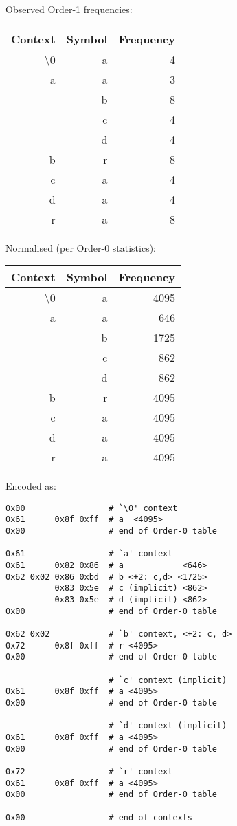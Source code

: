 \documentclass[a4paper]{article}
\begin{document}
\begin{minipage}[t]{0.5\textwidth}
Observed Order-1 frequencies:
\\[8pt]
\begin{tabular}{ |r|r|r| }
\hline
Context & Symbol & Frequency\\
\hline
\textbackslash0 & a & 4 \\
\hline
a & a & 3 \\
  & b & 8 \\
  & c & 4 \\
  & d & 4 \\
\hline
b & r & 8 \\
\hline
c & a & 4 \\
\hline
d & a & 4 \\
\hline
r & a & 8 \\
\hline
\end{tabular}
\end{minipage}
\begin{minipage}[t]{0.5\textwidth}
Normalised (per Order-0 statistics):
\\[8pt]
\begin{tabular}{ |r|r|r|}
\hline
Context & Symbol & Frequency\\
\hline
\textbackslash0 & a & 4095 \\
\hline
a & a &  646 \\
  & b & 1725 \\
  & c &  862 \\
  & d &  862 \\
\hline
b & r & 4095 \\
\hline
c & a & 4095 \\
\hline
d & a & 4095 \\
\hline
r & a & 4095 \\
\hline
\end{tabular}
\end{minipage}


Encoded as:
\begin{verbatim}
0x00                 # `\0' context
0x61      0x8f 0xff  # a  <4095>
0x00                 # end of Order-0 table

0x61                 # `a' context
0x61      0x82 0x86  # a            <646>
0x62 0x02 0x86 0xbd  # b <+2: c,d> <1725>
          0x83 0x5e  # c (implicit) <862>
          0x83 0x5e  # d (implicit) <862>
0x00                 # end of Order-0 table

0x62 0x02            # `b' context, <+2: c, d>
0x72      0x8f 0xff  # r <4095>
0x00                 # end of Order-0 table

                     # `c' context (implicit)
0x61      0x8f 0xff  # a <4095>
0x00                 # end of Order-0 table

                     # `d' context (implicit)
0x61      0x8f 0xff  # a <4095>
0x00                 # end of Order-0 table

0x72                 # `r' context
0x61      0x8f 0xff  # a <4095>
0x00                 # end of Order-0 table

0x00                 # end of contexts
\end{verbatim}
\end{document}
